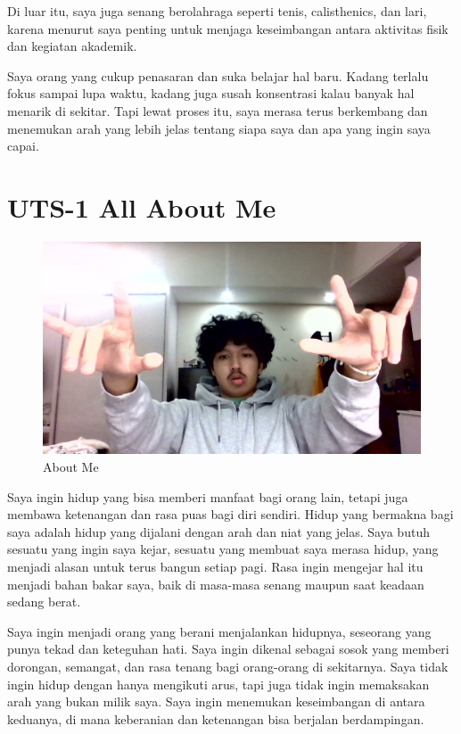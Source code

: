 \documentclass[
  letterpaper,
  DIV=11,
  numbers=noendperiod]{scrreprt}
\begin{document}
Di luar itu, saya juga senang berolahraga seperti tenis, calisthenics,
dan lari, karena menurut saya penting untuk menjaga keseimbangan antara
aktivitas fisik dan kegiatan akademik.

Saya orang yang cukup penasaran dan suka belajar hal baru. Kadang
terlalu fokus sampai lupa waktu, kadang juga susah konsentrasi kalau
banyak hal menarik di sekitar. Tapi lewat proses itu, saya merasa terus
berkembang dan menemukan arah yang lebih jelas tentang siapa saya dan
apa yang ingin saya capai.


\chapter{UTS-1 All About Me}\label{uts-1-all-about-me}

\begin{figure}[H]

{\centering \includegraphics[width=9.5\linewidth,height=\textheight,keepaspectratio]{All_About_me/../images/esa.jpg}

}

\caption{About Me}

\end{figure}%

Saya ingin hidup yang bisa memberi manfaat bagi orang lain, tetapi juga
membawa ketenangan dan rasa puas bagi diri sendiri. Hidup yang bermakna
bagi saya adalah hidup yang dijalani dengan arah dan niat yang jelas.
Saya butuh sesuatu yang ingin saya kejar, sesuatu yang membuat saya
merasa hidup, yang menjadi alasan untuk terus bangun setiap pagi. Rasa
ingin mengejar hal itu menjadi bahan bakar saya, baik di masa-masa
senang maupun saat keadaan sedang berat.

Saya ingin menjadi orang yang berani menjalankan hidupnya, seseorang
yang punya tekad dan keteguhan hati. Saya ingin dikenal sebagai sosok
yang memberi dorongan, semangat, dan rasa tenang bagi orang-orang di
sekitarnya. Saya tidak ingin hidup dengan hanya mengikuti arus, tapi
juga tidak ingin memaksakan arah yang bukan milik saya. Saya ingin
menemukan keseimbangan di antara keduanya, di mana keberanian dan
ketenangan bisa berjalan berdampingan.
\end{document}
